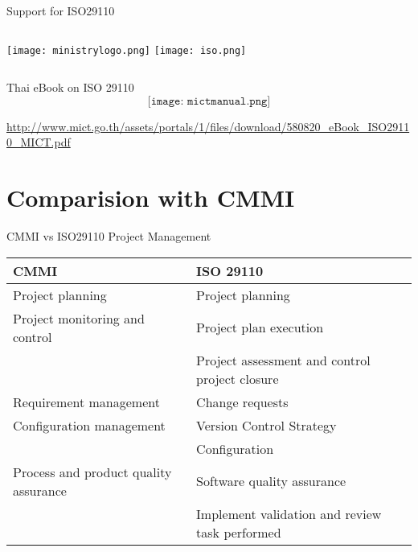 \begin{frame}{Support for ISO29110}
\begin{columns}
\texttt{[image: ministrylogo.png]}
\column{.1in}
\relax
{}
\texttt{[image: iso.png]}
\column{.1in}
\relax
\end{columns}
\end{frame}

\begin{frame}{Thai eBook on ISO 29110}
$$\texttt{[image: mictmanual.png]}$$

\tiny
\url{http://www.mict.go.th/assets/portals/1/files/download/580820_eBook_ISO29110_MICT.pdf}
\end{frame}

\section{Comparision with CMMI}

\begin{frame}{CMMI vs ISO29110 Project Management}
\small

\begin{tabular}{p{2in}p{2in}}
CMMI & ISO 29110 \\
\hline
Project planning & Project planning \\
\hline
Project monitoring and control & Project plan execution \\
& Project assessment and control project closure \\
\hline
Requirement management & Change requests\\
\hline
Configuration management & Version Control Strategy \\
 & Configuration \\
\hline
Process and product quality assurance &
 Software quality assurance\\
 & Implement validation and review task performed\\
\hline
\end{tabular}

\end{frame}


